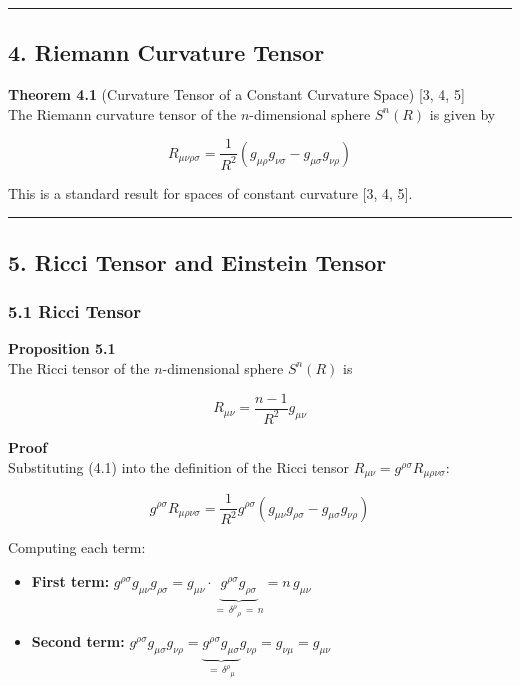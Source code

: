 \documentclass[a4paper,11pt]{article}
\theoremstyle{definition}
\providecommand{\tightlist}{\setlength{\itemsep}{0pt}\setlength{\parskip}{0pt}}
\begin{document}
\begin{center}\rule{0.5\linewidth}{0.5pt}\end{center}

\subsection{4. Riemann Curvature Tensor}\label{riemann-curvature-tensor}

\textbf{Theorem 4.1} (Curvature Tensor of a Constant Curvature Space) {[}3, 4, 5{]}\\
The Riemann curvature tensor of the \(n\)-dimensional sphere \(S^n(R)\) is given by

\[R_{\mu\nu\rho\sigma} = \frac{1}{R^2}(g_{\mu\rho}g_{\nu\sigma} - g_{\mu\sigma}g_{\nu\rho}) \tag{4.1}\]

This is a standard result for spaces of constant curvature {[}3, 4, 5{]}.

\begin{center}\rule{0.5\linewidth}{0.5pt}\end{center}

\subsection{5. Ricci Tensor and Einstein Tensor}\label{ricci-tensor-and-einstein-tensor}

\subsubsection{5.1 Ricci Tensor}\label{ricci-tensor}

\textbf{Proposition 5.1}\\
The Ricci tensor of the \(n\)-dimensional sphere \(S^n(R)\) is

\[R_{\mu\nu} = \frac{n-1}{R^2}g_{\mu\nu} \tag{5.1}\]

\textbf{Proof}\\
Substituting (4.1) into the definition of the Ricci tensor \(R_{\mu\nu} = g^{\rho\sigma}R_{\mu\rho\nu\sigma}\):

\[g^{\rho\sigma}R_{\mu\rho\nu\sigma} = \frac{1}{R^2}g^{\rho\sigma}(g_{\mu\nu}g_{\rho\sigma} - g_{\mu\sigma}g_{\nu\rho})\]

Computing each term:

\begin{itemize}
\tightlist
\item
  \textbf{First term:} \(g^{\rho\sigma}g_{\mu\nu}g_{\rho\sigma} = g_{\mu\nu}\cdot\underbrace{g^{\rho\sigma}g_{\rho\sigma}}_{=\,\delta^\rho{}_\rho\,=\,n} = n\,g_{\mu\nu}\)
\item
  \textbf{Second term:} \(g^{\rho\sigma}g_{\mu\sigma}g_{\nu\rho} = \underbrace{g^{\rho\sigma}g_{\mu\sigma}}_{=\,\delta^\rho{}_\mu}g_{\nu\rho} = g_{\nu\mu} = g_{\mu\nu}\)
\end{itemize}
\end{document}
